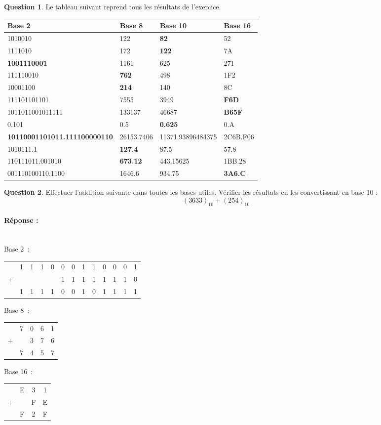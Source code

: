 \documentclass[11pt,a4paper]{article}
\theoremstyle{definition}%
\newtheorem{Q}{Question}[] %
\newcommand{\reponse}[1]{%
	\ifthenelse {\boolean{corrige}} {\paragraph{Réponse :} \color{darkblue}   #1\color{black}} {}
 }
\begin{document}
\begin{Q}
{	Le tableau suivant reprend tous les résultats de l'exercice.
		\begin{center}
			\begin{tabular}{|l|l|l|l|}\hline
				Base 2 & Base 8 & Base 10 & Base 16 \\ \hline
				1010010 & 122 & \textbf{82} & 52 \\ \hline
				1111010 & 172 & \textbf{122} & 7A \\ \hline
				\textbf{1001110001} & 1161 & 625 & 271 \\ \hline
				111110010 & \textbf{762} & 498 & 1F2 \\ \hline
				10001100 & \textbf{214} & 140 & 8C \\ \hline
				111101101101 & 7555 & 3949 & \textbf{F6D} \\ \hline
				1011011001011111 & 133137 & 46687 & \textbf{B65F} \\ \hline
				0.101 & 0.5 & \textbf{0.625} & 0.A \\ \hline
				\textbf{10110001101011.111100000110} & 26153.7406 & 11371.93896484375 & 2C6B.F06 \\ \hline
				1010111.1 & \textbf{127.4} & 87.5 & 57.8 \\ \hline
				110111011.001010 & \textbf{673.12} & 443.15625 & 1BB.28 \\ \hline
				001110100110.1100 & 1646.6 & 934.75 & \textbf{3A6.C} \\ \hline
			\end{tabular}
		\end{center}
	}
\end{Q}

\begin{Q}
Effectuer l’addition suivante dans toutes les bases utiles. Vérifier les résultats en
les convertissant en base 10 :
$$(3633)_{10} + (254)_{10}$$

\reponse{~\\
	Base 2~:
	\begin{tabular}{ccccccccccccc}
		& 1 & 1 & 1 & 0 & 0 & 0 & 1 & 1 & 0 & 0 & 0 & 1 \\
		+ & &   &   &   & 1 & 1 & 1 & 1 & 1 & 1 & 1 & 0\\ \hline
		& 1 & 1 & 1 & 1 & 0 & 0 & 1 & 0 & 1 & 1 & 1 & 1 \\
	\end{tabular}

	Base 8~:
	\begin{tabular}{ccccc}
		  & 7 & 0 & 6 & 1 \\
		+ &   & 3 & 7 & 6 \\ \hline
		  & 7 & 4 & 5 & 7 \\
		\end{tabular}

	Base 16~:
	\begin{tabular}{cccc}
		& E & 3 & 1 \\
		+ & & F & E \\ \hline
		& F & 2 & F\\
	\end{tabular}
}
\end{Q}
\end{document}
